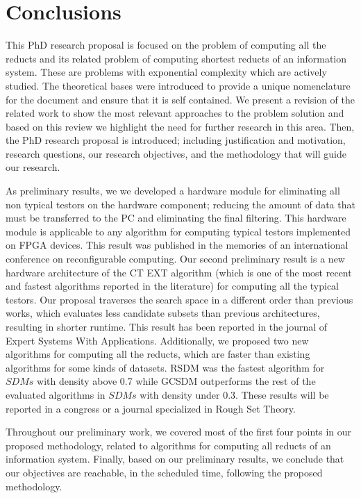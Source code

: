 \documentclass[authoryear,11pt]{elsarticle}
\begin{document}
\newpage 
\section{Conclusions}
	This PhD research proposal is focused on the problem of computing all the reducts and its related problem of
	computing shortest reducts of an information system. These are problems with exponential complexity which are
	actively studied. The theoretical bases were introduced to provide a unique nomenclature for the document and
	ensure that it is self contained. We present a revision of the related work to show the most relevant 
	approaches to the problem solution and based on this review we highlight the need for further research in this
	area. Then, the PhD research proposal is introduced; including justification and motivation, research 
	questions, our research objectives, and the methodology that will guide our research.
	
	As preliminary results, we we developed a hardware module for eliminating all non typical testors on the
	hardware component; reducing the amount of data that must be transferred to the PC and eliminating the final
	filtering. This hardware module is applicable to any algorithm for computing typical testors implemented on
	FPGA devices. This result was published in the memories of an international conference on reconfigurable
	computing.
	Our second preliminary result is a new hardware architecture of the CT EXT algorithm (which is one of the 
	most recent and fastest algorithms reported in the literature) for computing all the typical testors. Our 
	proposal traverses the search space in a different order than previous works, which evaluates less candidate 
	subsets than previous architectures, resulting in shorter runtime. This result has been reported in the 
	journal of Expert Systems With Applications. Additionally, we proposed two new algorithms for computing all 	
	the reducts, which are faster than existing algorithms for some kinds of datasets.
	RSDM was the fastest algorithm for $SDMs$ with density above 0.7 while GCSDM outperforms the rest of the
	evaluated algorithms in $SDMs$ with density under 0.3. These results will be reported in a congress or a 
	journal specialized in Rough Set Theory.

	Throughout our preliminary work, we covered most of the first four points in our proposed methodology, related
	to algorithms for computing all reducts of an information system.
	Finally, based on our preliminary results, we conclude that our objectives are reachable, in the scheduled
	time, following 	the proposed methodology.
	
\newpage 
{}

\end{document}
